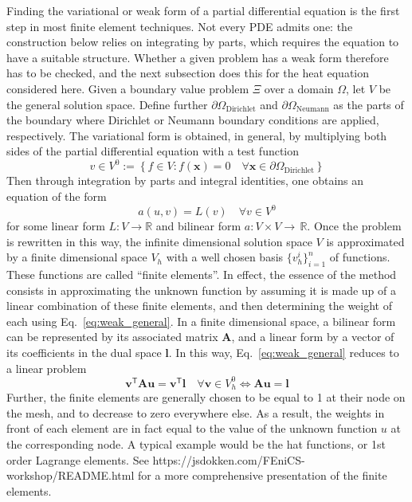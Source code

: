 \documentclass{article}
\newcommand{\assign}{:=}
\newcommand{\tmmathbf}[1]{\ensuremath{\boldsymbol{#1}}}
\newcommand{\tmop}[1]{\ensuremath{\operatorname{#1}}}
\begin{document}
Finding the variational or weak form of a partial differential equation is the
first step in most finite element techniques. Not every PDE admits one: the
construction below relies on integrating by parts, which requires the equation
to have a suitable structure. Whether a given problem has a weak
form therefore has to be checked, and the next subsection does this for the
heat equation considered here. Given a boundary value problem
$\Xi$ over a domain $\Omega$, let $V$ be the general solution space. Define
further $\partial \Omega_{\tmop{Dirichlet}}$ and $\partial
\Omega_{\tmop{Neumann}}$ as the parts of the boundary where Dirichlet or
Neumann boundary conditions are applied, respectively. The variational form is
obtained, in general, by multiplying both sides of the partial differential
equation with a test function
\[ v \in V^0 \assign \left\{ f \in V : f (\mathbf{x}) = 0 \quad \forall
   \mathbf{x} \in \partial \Omega_{\tmop{Dirichlet}}  \right\} \]
Then through integration by parts and integral identities, one obtains an
equation of the form
\begin{equation}
  \label{eq:weak_general}
  a (u, v) = L (v) \quad \forall v \in V^0
\end{equation}
for some linear form $L : V \rightarrow \mathbb{R}$ and bilinear form $a : V
\times V \rightarrow \, \mathbb{R}$. Once the problem is rewritten in this
way, the infinite dimensional solution space $V$ is approximated by a finite
dimensional space $V_h$ with a well chosen basis $\{ v^i_h \}_{i = 1}^n$ of
functions. These functions are called ``finite elements''. In effect, the
essence of the method consists in approximating the unknown function by
assuming it is made up of a linear combination of these finite elements, and
then determining the weight of each using Eq.~\eqref{eq:weak_general}. In a
finite dimensional space, a bilinear form can be represented by its associated
matrix $\mathbf{A}$, and a linear form by a vector of its coefficients in the
dual space $\tmmathbf{l}$. In this way, Eq.~\eqref{eq:weak_general} reduces to
a linear problem
\[ \mathbf{v}^\mathsf{T}\mathbf{A}\mathbf{u}=\mathbf{v}^\mathsf{T}\tmmathbf{l}\quad \forall\mathbf{v}\in V^0_h \iff \mathbf{A}\mathbf{u}=\tmmathbf{l} \]
Further, the finite elements are generally chosen to be equal to 1 at their
node on the mesh, and to decrease to zero everywhere else. As a result, the
weights in front of each element are in fact equal to the value of the unknown
function $u$ at the corresponding node. A typical example would be the hat
functions, or 1st order Lagrange elements. See
https://jsdokken.com/FEniCS-workshop/README.html for a more comprehensive
presentation of the finite elements.
\end{document}

